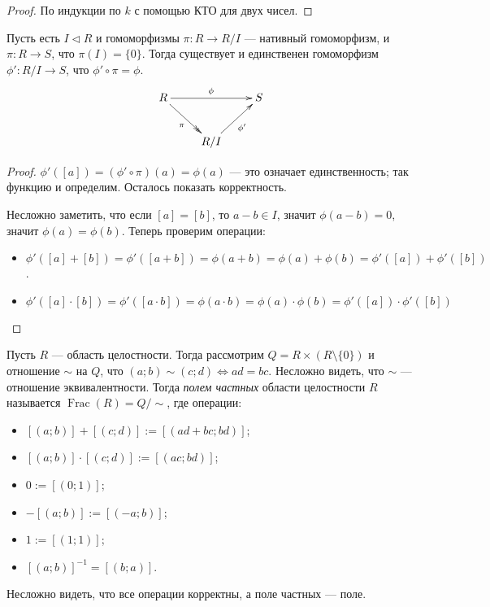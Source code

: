 \documentclass[12pt,a4paper]{article}
\DeclareMathOperator{\Frac}{Frac}
\begin{document}
    \begin{proof}
        По индукции по $k$ с помощью КТО для двух чисел.
    \end{proof}

    \begin{theorem}
        Пусть есть $I \triangleleft R$ и гомоморфизмы $\pi: R \to R/I$ --- нативный гомоморфизм, и $\pi: R \to S$, что $\pi(I) = \{0\}$. Тогда существует и единственен гомоморфизм $\phi': R/I \to S$, что $\phi' \circ \pi = \phi$.
        \[
            \xymatrix{
                R \ar@{->>}[rd]_{\pi} \ar[rr]^\phi && S\\
                & R/I \ar[ur]_{\phi'}
            }
        \]
    \end{theorem}

    \begin{proof}
        $\phi'([a]) = (\phi' \circ \pi)(a) = \phi(a)$ --- это означает единственность; так функцию и определим. Осталось показать корректность.

        Несложно заметить, что если $[a] = [b]$, то $a - b \in I$, значит $\phi(a - b) = 0$, значит $\phi(a) = \phi(b)$. Теперь проверим операции:
        \begin{itemize}
            \item $\phi'([a] + [b]) = \phi'([a + b]) = \phi(a + b) = \phi(a) + \phi(b) = \phi'([a]) + \phi'([b])$.
            \item $\phi'([a] \cdot [b]) = \phi'([a \cdot b]) = \phi(a \cdot b) = \phi(a) \cdot \phi(b) = \phi'([a]) \cdot \phi'([b])$
        \end{itemize}
    \end{proof}

    \begin{definition}
        Пусть $R$ --- область целостности. Тогда рассмотрим $Q = R \times (R \setminus \{0\})$ и отношение $\sim$ на $Q$, что $(a; b) \sim (c; d) \Leftrightarrow ad = bc$. Несложно видеть, что $\sim$ --- отношение эквивалентности. Тогда \emph{полем частных} области целостности $R$ называется $\Frac(R) = Q/\sim$, где операции:
        \begin{itemize}
            \item $[(a; b)] + [(c; d)] := [(ad + bc; bd)]$;
            \item $[(a; b)] \cdot [(c; d)] := [(ac; bd)]$;
            \item $0 := [(0; 1)]$;
            \item $- [(a; b)] := [(-a; b)]$;
            \item $1 := [(1; 1)]$;
            \item $[(a; b)]^{-1} = [(b; a)]$.
        \end{itemize}
        Несложно видеть, что все операции корректны, а поле частных --- поле.
    \end{definition}
\end{document}
